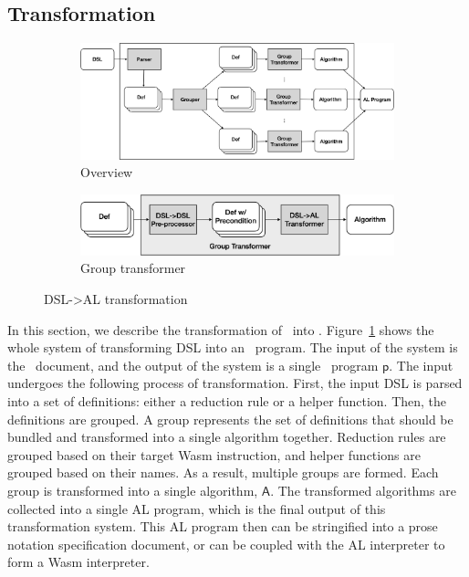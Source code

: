 \subsection{Transformation}

\begin{figure}
  \centering
  \begin{subfigure}[b]{0.9\textwidth}
    \includegraphics[width=\textwidth]{../img/trans1}
    \caption{Overview}
    \label{fig:overview}
  \end{subfigure}
  \hfill
  \begin{subfigure}[b]{0.9\textwidth}
    \includegraphics[width=\textwidth]{../img/trans2}
    \caption{Group transformer}
    \label{fig:grouptrans}
  \end{subfigure}
  \caption{DSL->AL transformation}
  \label{fig:trans}
\end{figure}

In this section, we describe the transformation of \dsl~into \al.
Figure~\ref{fig:overview} shows the whole system of transforming DSL into an \al~program.
The input of the system is the \dsl~document,
and the output of the system is a single \al~program $\mathsf{p}$.
The input undergoes the following process of transformation.
First, the input DSL is parsed into a set of definitions: either a reduction rule or a
helper function. Then, the definitions are grouped.
A group represents the set of definitions that should be bundled and transformed
into a single algorithm together.
Reduction rules are grouped based on
their target Wasm instruction, and helper functions are grouped based on their names.
As a result, multiple groups are formed. Each group is transformed into a single algorithm,
$\mathsf{A}$. The transformed algorithms are collected into a single AL program, which is the
final output of this transformation system. This AL program then can be stringified into a
prose notation specification document, or can be coupled with the AL interpreter to form a Wasm interpreter.

